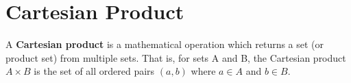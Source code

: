 
\section{Cartesian Product}
 A \textbf{Cartesian product} is a mathematical operation which returns a set (or product set) from multiple sets. That is, for sets A and B, the Cartesian product $A \times B$ is the set of all ordered pairs $(a, b)$ where $a \in A$ and $b \in B$.


